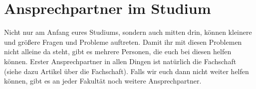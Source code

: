 \section{Ansprechpartner im Studium}

Nicht nur am Anfang eures Studiums, sondern auch mitten drin, können kleinere und größere Fragen und Probleme auftreten. Damit ihr mit diesen Problemen nicht alleine da steht, gibt es mehrere Personen, die euch bei diesen helfen können. Erster Ansprechpartner in allen Dingen ist natürlich die Fachschaft (siehe dazu Artikel über die Fachschaft). Falls wir euch dann nicht weiter helfen können, gibt es an jeder Fakultät noch weitere Ansprechpartner.

\newcommand{\proffoto}[2]{
    \centering
    \texttt{[image: \#1]}\\
    #2
    \vspace{4mm}
}

